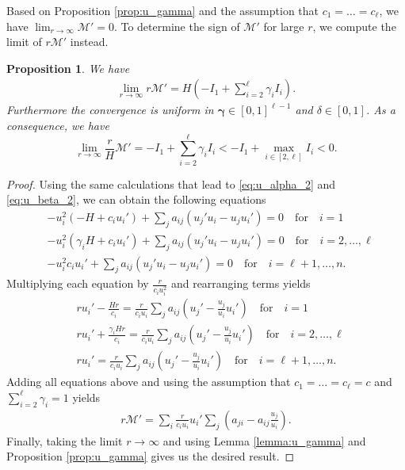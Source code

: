 \documentclass[11pt]{article}
\newtheorem{proposition}[theorem]{Proposition}
\def\MM{\mathcal{M}}
\theoremstyle{definition}
\begin{document}
Based on Proposition \ref{prop:u_gamma} and the assumption that $c_1=\dots=c_\ell$, we have $\lim_{r\to\infty}\MM' = 0$. To determine the sign of $\MM'$ for large $r$, we compute the limit of $r\MM'$ instead. 

\begin{proposition}\label{prop:rM'}
      We have
    \begin{align*}
        \lim_{r\to\infty} r\MM' = H(-I_{1}+\sum_{i=2}^\ell\gamma_i I_i).
    \end{align*}
    Furthermore the convergence is uniform in $\bm\gamma\in [0, 1]^{\ell-1}$ and $\delta\in [0, 1]$. As a consequence, we have 
     \[
    \lim_{r\to\infty} \frac{r}{H}\MM'=-I_{1}+\sum_{i=2}^\ell\gamma_i I_i < - I_1+\max_{i\in[2,\ell]}I_i<0. 
    \]   
\end{proposition}


\begin{proof}
Using the same calculations that lead to \eqref{eq:u_alpha_2} and \eqref{eq:u_beta_2}, we can obtain the following equations
\begin{align*}
    &-u_i^2(-H+c_iu_i')+\sum_j a_{ij}(u_j'u_i-u_ju_i')=0 \quad \text{for} \quad i=1\\
    &-u_i^2(\gamma_iH+c_iu_i')+\sum_j a_{ij}(u_j'u_i-u_ju_i')=0 \quad \text{for} \quad i=2,\dots,\ell\\
    &-u_i^2c_iu_i'+\sum_j a_{ij}(u_j'u_i-u_ju_i')=0 \quad \text{for} \quad i=\ell+1,\dots,n.
\end{align*}
Multiplying each equation by $\frac{r}{c_iu_i^2}$ and rearranging terms yields
\begin{align*}
    &ru_i' - \frac{Hr}{c_i}=\frac{r}{c_iu_i} \sum_ja_{ij}(u_j'-\frac{u_j}{u_i}u_i')\quad \text{for} \quad i=1\\
    &ru_i' + \frac{\gamma_iHr}{c_i}=\frac{r}{c_iu_i} \sum_ja_{ij}(u_j'-\frac{u_j}{u_i}u_i') \quad \text{for} \quad i=2,\dots,\ell\\
    &ru_i'=\frac{r}{c_iu_i} \sum_ja_{ij}(u_j'-\frac{u_j}{u_i}u_i') \quad \text{for} \quad i=\ell+1,\dots,n.
\end{align*}
Adding all equations above and using the assumption that $c_1=\dots=c_\ell=c$ and $\sum_{i=2}^\ell \gamma_i=1$ yields
\begin{align*}
    r\MM'= \sum_i \frac{r}{c_iu_i} u_i'\sum_j \left(a_{ji} - a_{ij} \frac{u_j}{u_i}\right).
\end{align*}
Finally, taking the limit $r\to\infty$ and using Lemma \ref{lemma:u_gamma} and Proposition \ref{prop:u_gamma} gives us the desired result. 
\end{proof}
\end{document}

